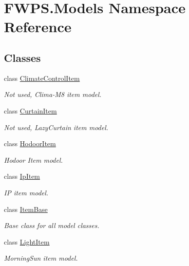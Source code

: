 \hypertarget{namespace_f_w_p_s_1_1_models}{}\section{F\+W\+P\+S.\+Models Namespace Reference}
\label{namespace_f_w_p_s_1_1_models}
\subsection*{Classes}
\begin{DoxyCompactItemize}
\item 
class \mbox{\hyperlink{class_f_w_p_s_1_1_models_1_1_climate_control_item}{Climate\+Control\+Item}}
\begin{DoxyCompactList}\small\item\em Not used, Clima-\/\+M8 item model. \end{DoxyCompactList}\item 
class \mbox{\hyperlink{class_f_w_p_s_1_1_models_1_1_curtain_item}{Curtain\+Item}}
\begin{DoxyCompactList}\small\item\em Not used, Lazy\+Curtain item model. \end{DoxyCompactList}\item 
class \mbox{\hyperlink{class_f_w_p_s_1_1_models_1_1_hodoor_item}{Hodoor\+Item}}
\begin{DoxyCompactList}\small\item\em Hodoor Item model. \end{DoxyCompactList}\item 
class \mbox{\hyperlink{class_f_w_p_s_1_1_models_1_1_ip_item}{Ip\+Item}}
\begin{DoxyCompactList}\small\item\em IP item model. \end{DoxyCompactList}\item 
class \mbox{\hyperlink{class_f_w_p_s_1_1_models_1_1_item_base}{Item\+Base}}
\begin{DoxyCompactList}\small\item\em Base class for all model classes. \end{DoxyCompactList}\item 
class \mbox{\hyperlink{class_f_w_p_s_1_1_models_1_1_light_item}{Light\+Item}}
\begin{DoxyCompactList}\small\item\em Morning\+Sun item model. \end{DoxyCompactList}\item 

\end{DoxyCompactItemize}
